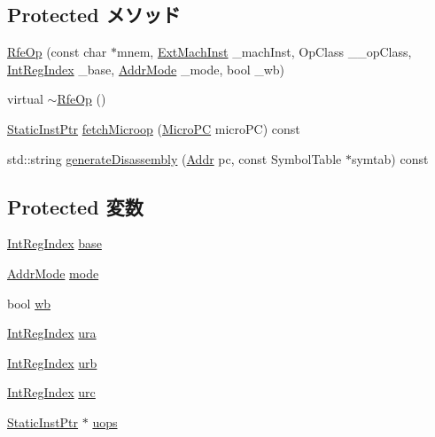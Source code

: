\subsection*{Protected メソッド}
\begin{DoxyCompactItemize}
\item 
\hyperlink{classArmISA_1_1RfeOp_a2379b1991207f7cc821855a9a8057305}{RfeOp} (const char $\ast$mnem, \hyperlink{classStaticInst_a5605d4fc727eae9e595325c90c0ec108}{ExtMachInst} \_\-machInst, OpClass \_\-\_\-opClass, \hyperlink{namespaceArmISA_ae64680ba9fb526106829d6bf92fc791b}{IntRegIndex} \_\-base, \hyperlink{classArmISA_1_1RfeOp_abf132b4ad93f3557cd3956577592ba68}{AddrMode} \_\-mode, bool \_\-wb)
\item 
virtual \hyperlink{classArmISA_1_1RfeOp_ad15b456953baa96c091d58d121c183b7}{$\sim$RfeOp} ()
\item 
\hyperlink{classRefCountingPtr}{StaticInstPtr} \hyperlink{classArmISA_1_1RfeOp_ae9e7acd6304ee397f1ab470e283ae76b}{fetchMicroop} (\hyperlink{base_2types_8hh_adfb4d8b20c5abc8be73dd367b16f2d57}{MicroPC} microPC) const 
\item 
std::string \hyperlink{classArmISA_1_1RfeOp_a3134956ec18bb095818e06eb988f6c55}{generateDisassembly} (\hyperlink{classm5_1_1params_1_1Addr}{Addr} pc, const SymbolTable $\ast$symtab) const 
\end{DoxyCompactItemize}
\subsection*{Protected 変数}
\begin{DoxyCompactItemize}
\item 
\hyperlink{namespaceArmISA_ae64680ba9fb526106829d6bf92fc791b}{IntRegIndex} \hyperlink{classArmISA_1_1RfeOp_ad7a926fdfe0820284d654e9139a423b2}{base}
\item 
\hyperlink{classArmISA_1_1RfeOp_abf132b4ad93f3557cd3956577592ba68}{AddrMode} \hyperlink{classArmISA_1_1RfeOp_a273a5f1b71915654f056568ae963b5de}{mode}
\item 
bool \hyperlink{classArmISA_1_1RfeOp_a93541ed16711b2c9c53cf093b675d90b}{wb}
\item 
\hyperlink{namespaceArmISA_ae64680ba9fb526106829d6bf92fc791b}{IntRegIndex} \hyperlink{classArmISA_1_1RfeOp_a605d05e28dce4515bfd33f74e709f29d}{ura}
\item 
\hyperlink{namespaceArmISA_ae64680ba9fb526106829d6bf92fc791b}{IntRegIndex} \hyperlink{classArmISA_1_1RfeOp_aa5ea75563934f5379a9abef2877e781c}{urb}
\item 
\hyperlink{namespaceArmISA_ae64680ba9fb526106829d6bf92fc791b}{IntRegIndex} \hyperlink{classArmISA_1_1RfeOp_a86973ec62735a43f3925953a6b8afc99}{urc}
\item 
\hyperlink{classRefCountingPtr}{StaticInstPtr} $\ast$ \hyperlink{classArmISA_1_1RfeOp_a4b95b3465f3133312f95fdaf25b90b36}{uops}
\end{DoxyCompactItemize}
